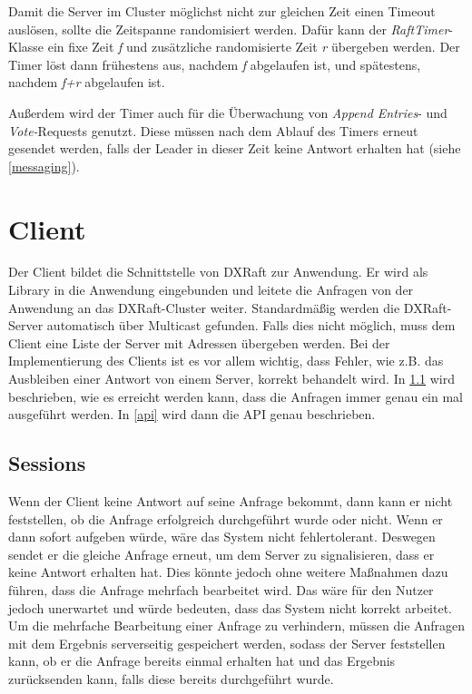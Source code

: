 Damit die Server im Cluster möglichst nicht zur gleichen Zeit einen Timeout auslösen, sollte die Zeitspanne randomisiert werden. Dafür kann der \textit{RaftTimer}-Klasse ein fixe Zeit \textit{f} und zusätzliche randomisierte Zeit \textit{r} übergeben werden. Der Timer löst dann frühestens aus, nachdem \textit{f} abgelaufen ist, und spätestens, nachdem \textit{f+r} abgelaufen ist.

Außerdem wird der Timer auch für die Überwachung von \textit{Append Entries}- und \textit{Vote-}Requests genutzt. Diese müssen nach dem Ablauf des Timers erneut gesendet werden, falls der Leader in dieser Zeit keine Antwort erhalten hat (siehe \ref{messaging}).

\section{Client}

Der Client bildet die Schnittstelle von DXRaft zur Anwendung. Er wird als Library in die Anwendung eingebunden und leitete die Anfragen von der Anwendung an das DXRaft-Cluster weiter. Standardmäßig werden die DXRaft-Server automatisch über Multicast gefunden. Falls dies nicht möglich, muss dem Client eine Liste der Server mit Adressen übergeben werden. Bei der Implementierung des Clients ist es vor allem wichtig, dass Fehler, wie z.B. das Ausbleiben einer Antwort von einem Server, korrekt behandelt wird. In \ref{sessions} wird beschrieben, wie es erreicht werden kann, dass die Anfragen immer genau ein mal ausgeführt werden. In \ref{api} wird dann die API genau beschrieben.

\subsection{Sessions}
\label{sessions}

Wenn der Client keine Antwort auf seine Anfrage bekommt, dann kann er nicht feststellen, ob die Anfrage erfolgreich durchgeführt wurde oder nicht. Wenn er dann sofort aufgeben würde, wäre das System nicht fehlertolerant. Deswegen sendet er die gleiche Anfrage erneut, um dem Server zu signalisieren, dass er keine Antwort erhalten hat. Dies könnte jedoch ohne weitere Maßnahmen dazu führen, dass die Anfrage mehrfach bearbeitet wird. Das wäre für den Nutzer jedoch unerwartet und würde bedeuten, dass das System nicht korrekt arbeitet. Um die mehrfache Bearbeitung einer Anfrage zu verhindern, müssen die Anfragen mit dem Ergebnis serverseitig gespeichert werden, sodass der Server feststellen kann, ob er die Anfrage bereits einmal erhalten hat und das Ergebnis zurücksenden kann, falls diese bereits durchgeführt wurde.

